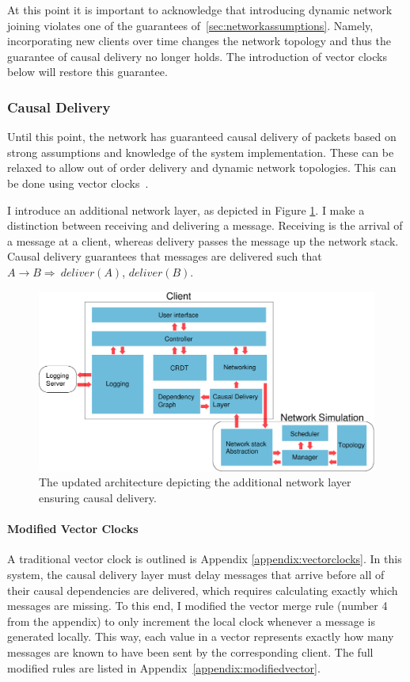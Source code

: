 \documentclass[12pt,a4paper,twoside,openright]{report}
\begin{document}
		At this point it is important to acknowledge that introducing dynamic network joining violates one of the guarantees of~\cref{sec:networkassumptions}. Namely, incorporating new clients over time changes the network topology and thus the guarantee of causal delivery no longer holds. The introduction of vector clocks below will restore this guarantee.
		
		\subsubsection{Causal Delivery} \label{sec:causaldelivery}
		Until this point, the network has guaranteed causal delivery of packets based on strong assumptions and knowledge of the system implementation. These can be relaxed to allow out of order delivery and dynamic network topologies. This can be done using vector clocks~\cite{fidge1987}.
		
		I introduce an additional network layer, as depicted in Figure \ref{fig:causal}. I make a distinction between receiving and delivering a message. Receiving is the arrival of a message at a client, whereas delivery passes the message up the network stack. Causal delivery guarantees that messages are delivered such that $A \rightarrow B \Rightarrow\ deliver(A)$, $deliver(B)$.
		

	\begin{figure}[H]
	\centering
	\includegraphics[width=1\linewidth]{figs/causal_arch_2.eps}
	\caption[Ensuring Causal Delivery]{The updated architecture depicting the additional network layer ensuring causal delivery.}
	\label{fig:causal}
	\end{figure}

	
		\paragraph{Modified Vector Clocks} \label{sec:modifiedvectors}
		A traditional vector clock is outlined is Appendix \ref{appendix:vectorclocks}. In this system, the causal delivery layer must delay messages that arrive before all of their causal dependencies are delivered, which requires calculating exactly which messages are missing. To this end, I modified the vector merge rule (number 4 from the appendix) to only increment the local clock whenever a message is generated locally. This way, each value in a vector represents exactly how many messages are known to have been sent by the corresponding client. The full modified rules are listed in Appendix~\ref{appendix:modifiedvector}.
		
\end{document}
